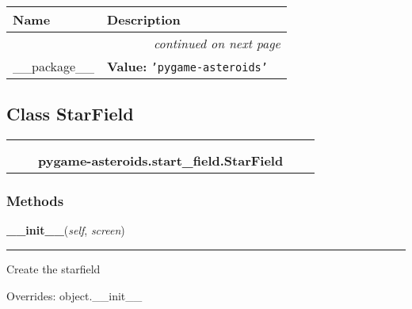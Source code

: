     \vspace{-1cm}
\hspace{\varindent}\begin{longtable}{|p{\varnamewidth}|p{\vardescrwidth}|l}
\cline{1-2}
\cline{1-2} \centering \textbf{Name} & \centering \textbf{Description}& \\
\cline{1-2}
\endhead\cline{1-2}\multicolumn{3}{r}{\small\textit{continued on next page}}\\\endfoot\cline{1-2}
\endlastfoot\raggedright \_\-\_\-p\-a\-c\-k\-a\-g\-e\-\_\-\_\- & \raggedright \textbf{Value:} 
{\tt \texttt{'}\texttt{pygame-asteroids}\texttt{'}}&\\
\cline{1-2}
\end{longtable}



\subsection{Class StarField}

    \label{pygame-asteroids:start_field:StarField}
\begin{tabular}{cccccc}
\multicolumn{2}{r}{\settowidth{\BCL}{object}\multirow{2}{\BCL}{object}}
&&
  \\\cline{3-3}
  &&\multicolumn{1}{c|}{}
&&
  \\
&&\multicolumn{2}{l}{\textbf{pygame-asteroids.start\_field.StarField}}
\end{tabular}



  \subsubsection{Methods}

    \vspace{0.5ex}

\hspace{.8\funcindent}\begin{boxedminipage}{\funcwidth}

    \raggedright \textbf{\_\_init\_\_}(\textit{self}, \textit{screen})

    \vspace{-1.5ex}

    \rule{\textwidth}{0.5\fboxrule}
\setlength{\parskip}{2ex}
    Create the starfield

\setlength{\parskip}{1ex}
      Overrides: object.\_\_init\_\_

    \end{boxedminipage}

